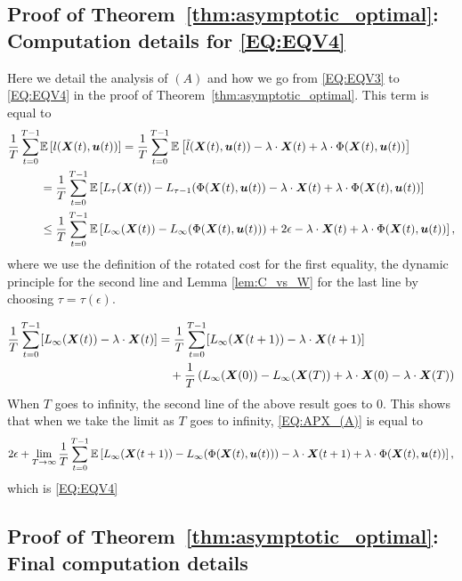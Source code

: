 \subsection{Proof of Theorem~\ref{thm:asymptotic_optimal}: Computation details for \eqref{EQ:EQV4}}
\label{apx:proof_thm1_details}

Here we detail the analysis of $(A)$ and how we go from \eqref{EQ:EQV3} to \eqref{EQ:EQV4} in the proof of Theorem~\ref{thm:asymptotic_optimal}.  This term is equal to 
\begin{align}
    \frac1T\sum_{t = 0}^{T-1} &\mathbb{E} \left[l({\bm{X}(t)}, \bm{u}(t))\right] = \frac1T\sum_{t = 0}^{T-1} \mathbb{E} \left[\Tilde{l}({\bm{X}}(t), \bm{u}(t)) - \lambda\cdot{\bm{X}}(t) + \lambda\cdot\Phi({\bm{X}}(t), \bm{u}(t)) \right] \nonumber\\
    &= \frac1T\sum_{t = 0}^{T-1} \mathbb{E} \left[ L_\tau({\bm{X}(t)}) - L_{\tau-1}(\Phi({\bm{X}(t)},\bm{u}(t)) - \lambda\cdot{\bm{X}}(t) + \lambda\cdot\Phi({\bm{X}}(t), \bm{u}(t))  \right]\nonumber\\
    &\le \frac1T\sum_{t = 0}^{T-1} \mathbb{E} \left[ L_\infty({\bm{X}(t)}) - L_{\infty}(\Phi({\bm{X}(t)},\bm{u}(t))) + 2\epsilon - \lambda\cdot{\bm{X}}(t) + \lambda\cdot\Phi({\bm{X}}(t), \bm{u}(t))  \right],
    \label{EQ:APX_(A)}
\end{align}
where we use the definition of the rotated cost for the first equality, the dynamic principle for the second line and Lemma \ref{lem:C_vs_W} for the last line by choosing $\tau = \tau(\epsilon)$.

\begin{align*}
     \frac1T\sum_{t = 0}^{T-1} [ L_\infty({\bm{X}(t)}) - \lambda \cdot{\bm{X}(t)}] &= \frac1T\sum_{t = 0}^{T-1} [ L_{\infty}({\bm{X}(t+1)}) - \lambda \cdot {\bm{X}(t+1)}]\\
     &\quad+ \frac1T\left(L_{\infty}({\bm{X}(0)}) - L_{\infty}({\bm{X}(T)}) +\lambda \cdot {\bm{X}(0)} - \lambda \cdot {\bm{X}(T)}\right)
\end{align*}
When $T$ goes to infinity, the second line of the above result goes to $0$. This shows that when we take the limit as $T$ goes to infinity, \eqref{EQ:APX_(A)} is equal to
\begin{align*}
    2\epsilon + \lim_{T\to\infty} \frac1T \sum_{t=0}^{T-1} \mathbb{E} \left[L_{\infty}({\bm{X}}(t + 1)) - L_{\infty}(\Phi({\bm{X}}(t), \bm{u}(t))) - \lambda\cdot{\bm{X}}(t + 1)  + \lambda \cdot\Phi({\bm{X}}(t), \bm{u}(t)) \right],
\end{align*}
which is \eqref{EQ:EQV4}

\subsection{Proof of Theorem~\ref{thm:asymptotic_optimal}: Final computation details}
\label{apx:C5}

